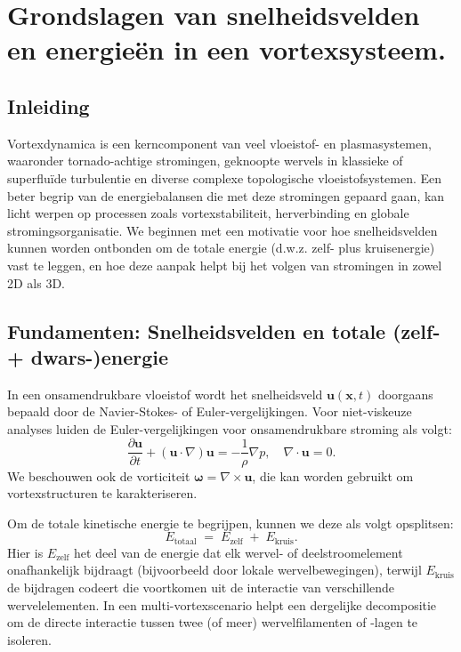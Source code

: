 \section{Grondslagen van snelheidsvelden en energieën in een vortexsysteem.}

\subsection{Inleiding}
Vortexdynamica is een kerncomponent van veel vloeistof- en plasmasystemen, waaronder
tornado-achtige stromingen, geknoopte wervels in klassieke of superfluïde turbulentie en diverse
complexe topologische vloeistofsystemen. Een beter begrip van de energiebalansen
die met deze stromingen gepaard gaan, kan licht werpen op processen zoals vortexstabiliteit, herverbinding
en globale stromingsorganisatie. We beginnen met een motivatie voor hoe snelheidsvelden kunnen worden
ontbonden om de totale energie (d.w.z. zelf- plus kruisenergie) vast te leggen, en hoe
deze aanpak helpt bij het volgen van stromingen in zowel 2D als 3D.

\subsection{Fundamenten: Snelheidsvelden en totale (zelf- + dwars-)energie}
\label{sec:foundations}
In een onsamendrukbare vloeistof wordt het snelheidsveld $\mathbf{u}(\mathbf{x}, t)$ doorgaans
bepaald door de Navier-Stokes- of Euler-vergelijkingen. Voor niet-viskeuze analyses luiden de Euler-vergelijkingen voor onsamendrukbare stroming als volgt:
\begin{equation}
\frac{\partial \mathbf{u}}{\partial t} + (\mathbf{u} \cdot \nabla)\mathbf{u} = -\frac{1}{\rho}\nabla p,
\quad \nabla \cdot \mathbf{u} = 0.\label{eq:appendix:Euler}
\end{equation}
We beschouwen ook de vorticiteit $\boldsymbol{\omega} = \nabla \times \mathbf{u}$,
die kan worden gebruikt om vortexstructuren te karakteriseren.

Om de totale kinetische energie te begrijpen, kunnen we deze als volgt opsplitsen:
\begin{equation}
E_{\text{totaal}} \;=\; E_{\text{zelf}} \;+\; E_{\text{kruis}}.\label{eq:appendix:totale-energie}
\end{equation}
Hier is $E_{\text{zelf}}$ het deel van de energie dat elk wervel- of deelstroomelement onafhankelijk bijdraagt ​​(bijvoorbeeld door lokale wervelbewegingen), terwijl
$E_{\text{kruis}}$ de bijdragen codeert die voortkomen uit de interactie van verschillende
wervelelementen. In een multi-vortexscenario helpt een dergelijke decompositie om de
directe interactie tussen twee (of meer) wervelfilamenten of -lagen te isoleren.

